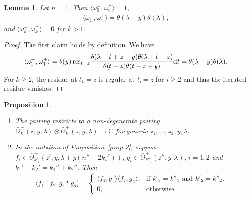 \documentclass[10pt,a4paper]{amsart}
\numberwithin{equation}{section}
\newtheorem{Lemma}[Theorem]{Lemma}
\newtheorem{Proposition}[Theorem]{Proposition}
 { \theoremstyle{definition}
\newtheorem{Definition}[Theorem]{Definition}
\newtheorem{Example}[Theorem]{Example}
\newtheorem{Remark}[Theorem]{Remark} }
\begin{document}
\begin{Lemma}\label{lemma-3} Let $n=1$. Then $\langle \omega^-_0,\omega^+_0\rangle=1$,
 \begin{gather*}
 \langle \omega^-_1,\omega^+_1\rangle=\theta(\lambda-y) \theta(\lambda),
 \end{gather*}
 and $\langle\omega^-_k,\omega^+_k\rangle=0$ for $k>1$.
\end{Lemma}
\begin{proof} The first claim holds by definition. We have
 \begin{gather*}
 \langle\omega^-_1,\omega^+_1\rangle =\theta(y)\,\mathrm{res}_{t=z}\frac{\theta(\lambda-t+z-y) \theta(\lambda+t-z)}{\theta(t-z)\theta(t-z+y)}{\rm d}t =\theta(\lambda-y) \theta(\lambda).
 \end{gather*}
 For $k\geq 2$, the residue at $t_1=z$ is regular at $t_i=z$ for $i\geq2$ and thus the iterated residue vanishes.
\end{proof}
\begin{Proposition}\label{prop-4}\quad \begin{enumerate}\itemsep=0pt
 \item[$(i)$] The pairing restricts to a non-degenerate pairing $\bar\Theta^-_k(z,y,\lambda) \otimes\bar\Theta^+_k(z,y,\lambda) \to \mathbb C$ for generic $z_1,\dots,z_n,y,\lambda$.
 \item[$(ii)$] In the notation of Proposition~{\rm \ref{prop-2}}, suppose $f_i\!\in\! \bar\Theta^-_{k'_i}(z',y,\lambda+y(n''-2k_i''))$, $g_i\!\in\! \bar\Theta^+_{k''_i}(z'',y,\lambda)$, $i=1,2$ and $k_1'+k_2'=k_1''+k_2''$. Then
 \begin{gather*}
 \langle f_1*f_2,g_1*g_2\rangle= \begin{cases}\langle f_1,g_1\rangle\langle f_2,g_2\rangle, & \text{if $k'_1=k''_1$ and $k'_2=k''_2$}, \\
 0,&\text{otherwise}.
 \end{cases}
 \end{gather*}
 \end{enumerate}
\end{Proposition}
\end{document}

